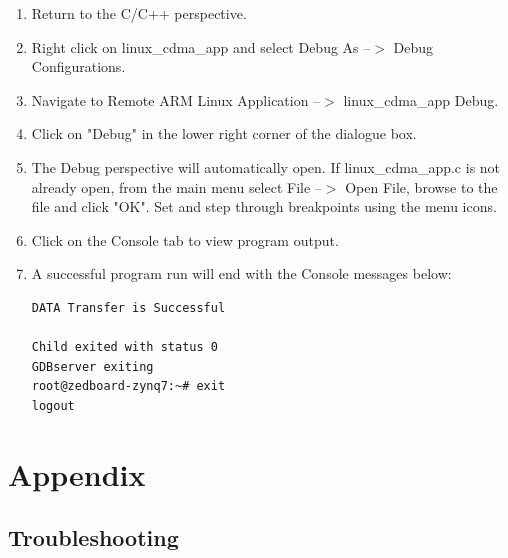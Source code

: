 \documentclass[12pt]{article}
\begin{document}
\begin{enumerate}
\item Return to the C/C++ perspective.
\item Right click on linux\_cdma\_app and select Debug As --$>$ Debug Configurations.
\item Navigate to Remote ARM Linux Application --$>$ linux\_cdma\_app Debug.
\item Click on "Debug" in the lower right corner of the dialogue box.
\item The Debug perspective will automatically open.  If linux\_cdma\_app.c is not already open, from the main menu select File --$>$ Open File, browse to the file and click "OK". Set and step through breakpoints using the menu icons.
\item Click on the Console tab to view program output. 
\item A successful program run will end with the Console messages below:
\begin{lstlisting}
DATA Transfer is Successful

Child exited with status 0
GDBserver exiting
root@zedboard-zynq7:~# exit
logout
\end{lstlisting}
\end{enumerate}
\section{Appendix}
\subsection{Troubleshooting}
\end{document}
